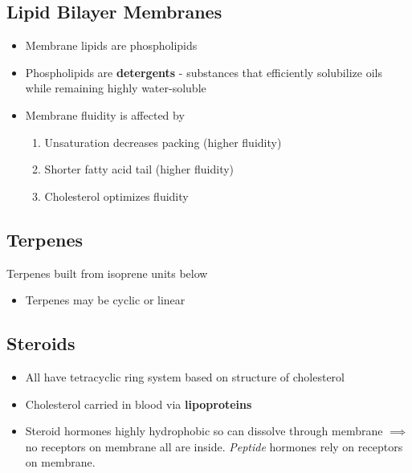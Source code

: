 \documentclass[10pt,a4paper]{report}
\begin{document}
	\subsection{Lipid Bilayer Membranes}
	
	\begin{itemize}
		\item Membrane lipids are phospholipids
		\item Phospholipids are \textbf{detergents} - substances that efficiently solubilize oils while remaining highly water-soluble
		\item Membrane fluidity is affected by
		\begin{enumerate}
			\item Unsaturation decreases packing (higher fluidity)
			\item Shorter fatty acid tail (higher fluidity)
			\item Cholesterol optimizes fluidity
		\end{enumerate}
	\end{itemize}
	
	\subsection{Terpenes}
	Terpenes built from isoprene units below
	
	\begin{center}
		\setatomsep{2.3em}
		\setcrambond{4pt}{}{}
		\chemfig{
			-[1](-[2])=[7]-[1]
		}
	\end{center}
	\begin{itemize}
		\item Terpenes may be cyclic or linear 
	\end{itemize}
	
	\subsection{Steroids}
	
	\begin{itemize}
		\item All have tetracyclic ring system based on structure of cholesterol
		\item Cholesterol carried in blood via \textbf{lipoproteins}
		\item Steroid hormones highly hydrophobic so can dissolve through membrane $\implies$ no receptors on membrane all are inside. \emph{Peptide} hormones rely on receptors on membrane.
	\end{itemize}
	
\end{document}
